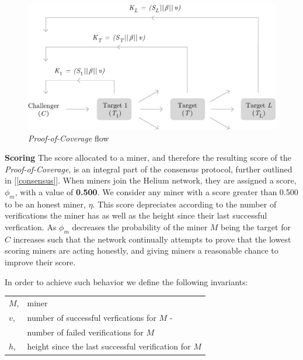 \documentclass[10pt, nonatbib, nocopyrightspace, reprint]{sigplanconf}
\newcommand{\secref}[1]{[\autoref{#1}]}
\begin{document}
\begin{figure}[ht]
    \begin{center}
          \includegraphics[width=\columnwidth]{o_propagation.eps}
          \caption{\emph{Proof-of-Coverage} flow}
          \label{fig:poc-propogation}
     \end{center}
\end{figure}

\textbf{Scoring} \label{scores} The score allocated to a miner, and therefore the resulting score of the \emph{Proof-of-Coverage}, is an integral part of the consensus protocol, further outlined in \secref{consensus}. When miners join the Helium network, they are assigned a score, $\phi_m$, with a value of \textbf{0.500}. We consider any miner with a score greater than 0.500 to be an honest miner, $\eta$. This score depreciates according to the number of verifications the miner has as well as the height since their last successful verfication. As $\phi_m$ decreases the probability of the miner $M$ being the target for $C$ increases such that the network continually attempts to prove that the lowest scoring miners are acting honestly, and giving miners a reasonable chance to improve their score.

In order to achieve such behavior we define the following invariants:

\begin{tabular}{l l}
        $M$, & miner                                         \\
        $v$, &number of successful verfications for $M$ -\\
        & number of failed verifications for $M$ \\
        $h$,          & height since the last successful verification for $M$\\
\end{tabular}
\end{document}
